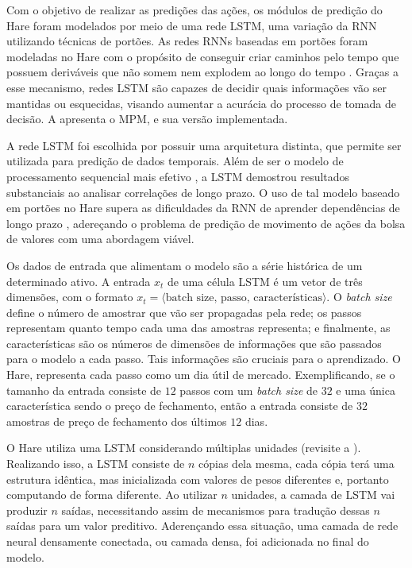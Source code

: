 Com o objetivo de realizar as predições das ações, os módulos de predição do Hare foram modelados por meio de uma rede \acrshort{LSTM}, uma variação da \acrshort{RNN} utilizando técnicas de portões. As redes \acrshort{RNN}s baseadas em portões foram modeladas no Hare com o propósito de conseguir criar caminhos pelo tempo que possuem deriváveis que não somem nem explodem ao longo do tempo \cite{deep_learning}. Graças a esse mecanismo, redes \acrshort{LSTM} são capazes de decidir quais informações vão ser mantidas ou esquecidas, visando aumentar a acurácia do processo de tomada de decisão. A  apresenta o \acrlong{MPM}, e sua versão implementada.

%

A rede \acrshort{LSTM} foi escolhida por possuir uma arquitetura distinta, que permite ser utilizada para predição de dados temporais. Além de ser o modelo de processamento sequencial mais efetivo \cite{deep_learning}, a LSTM demostrou resultados substanciais ao analisar correlações de longo prazo. O uso de tal modelo baseado em portões no Hare supera as dificuldades da \acrshort{RNN} de aprender dependências de longo prazo \cite{lstm}, adereçando o problema de predição de movimento de ações da bolsa de valores com uma abordagem viável.

Os dados de entrada que alimentam o modelo são a série histórica de um determinado ativo. A entrada $x_t$ de uma célula \acrshort{LSTM} é um vetor de três dimensões, com o formato $x_t = \langle \textrm{batch size, passo, características} \rangle$. O \emph{batch size} define o número de amostrar que vão ser propagadas pela rede; os passos representam quanto tempo cada uma das amostras representa; e finalmente, as características são os números de dimensões de informações que são passados para o modelo a cada passo. Tais informações são cruciais para o aprendizado. O Hare, representa cada passo como um dia útil de mercado. Exemplificando, se o tamanho da entrada consiste de $12$ passos com um \emph{batch size} de $32$ e uma única característica sendo o preço de fechamento, então a entrada consiste de $32$ amostras de preço de fechamento dos últimos $12$ dias.

O Hare utiliza uma LSTM considerando múltiplas unidades (revisite a ). Realizando isso, a \acrshort{LSTM} consiste de $n$ cópias dela mesma, cada cópia terá uma estrutura idêntica, mas inicializada com valores de pesos diferentes e, portanto computando de forma diferente. Ao utilizar $n$ unidades, a camada de \acrshort{LSTM} vai produzir $n$ saídas, necessitando assim de mecanismos para tradução dessas $n$ saídas para um valor preditivo. Aderençando essa situação, uma camada de rede neural densamente conectada, ou camada densa, foi adicionada no final do modelo. 

